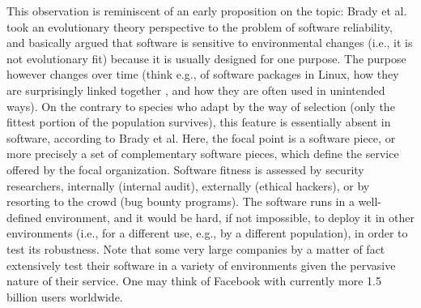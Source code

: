 This observation is reminiscent of an early proposition on the topic: Brady et al.  \cite{brady1999murphy} took an evolutionary theory perspective to the problem of software reliability, and basically argued that software is sensitive to environmental changes (i.e., it is not evolutionary fit) because it is usually designed for one purpose. The purpose however changes over time (think e.g., of software packages in Linux, how they are surprisingly linked together  \cite{maillart2008empirical}, and how they are often used in unintended ways). On the contrary to species who adapt by the way of selection (only the fittest portion of the population survives), this feature is essentially absent in software, according to Brady et al.
Here, the focal point is a software piece, or more precisely a set of complementary software pieces, which define the service offered by the focal organization. Software fitness is assessed by security researchers, internally (internal audit), externally (ethical hackers), or by resorting to the crowd (bug bounty programs). The software runs in a well-defined environment, and it would be hard, if not impossible, to deploy it in other environments (i.e., for a different use, e.g., by a different population), in order to test its robustness. Note that some very large companies by a matter of fact extensively test their software in a variety of environments given the pervasive nature of their service. One may think of Facebook with currently more 1.5 billion users worldwide.\\

